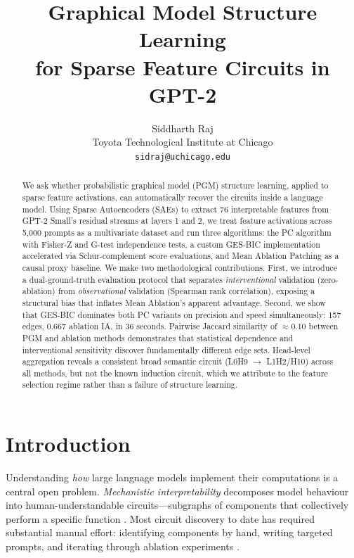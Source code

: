 \documentclass{article}
\title{Graphical Model Structure Learning\\for Sparse Feature Circuits in GPT-2}
\author{%
  Siddharth Raj \\
  Toyota Technological Institute at Chicago \\
  \texttt{sidraj@uchicago.edu}
}
\begin{document}
\maketitle

\begin{abstract}
We ask whether probabilistic graphical model (PGM) structure learning,
applied to sparse feature activations, can automatically recover the circuits
inside a language model.
Using Sparse Autoencoders (SAEs) to extract 76 interpretable features from
GPT-2 Small's residual streams at layers 1 and 2, we treat feature activations
across 5,000 prompts as a multivariate dataset and run three algorithms: the
PC algorithm with Fisher-Z and G-test independence tests, a custom GES-BIC
implementation accelerated via Schur-complement score evaluations, and Mean
Ablation Patching as a causal proxy baseline.
We make two methodological contributions.
First, we introduce a dual-ground-truth evaluation protocol that separates
\emph{interventional} validation (zero-ablation) from \emph{observational}
validation (Spearman rank correlation), exposing a structural bias that
inflates Mean Ablation's apparent advantage.
Second, we show that GES-BIC dominates both PC variants on precision and
speed simultaneously: 157 edges, 0.667 ablation IA, in 36 seconds.
Pairwise Jaccard similarity of $\approx 0.10$ between PGM and ablation methods
demonstrates that statistical dependence and interventional sensitivity
discover fundamentally different edge sets.
Head-level aggregation reveals a consistent broad semantic circuit
(L0H9 $\to$ L1H2/H10) across all methods, but not the known induction circuit,
which we attribute to the feature selection regime rather than a failure of
structure learning.
\end{abstract}

\section{Introduction}

Understanding \emph{how} large language models implement their computations is
a central open problem. \emph{Mechanistic interpretability} decomposes model
behaviour into human-understandable circuits---subgraphs of components that
collectively perform a specific function \citep{olah2020zoom,
elhage2021framework}. Most circuit discovery to date has required substantial
manual effort: identifying components by hand, writing targeted prompts, and
iterating through ablation experiments \citep{wang2022ioi, olsson2022induction}.
\end{document}
